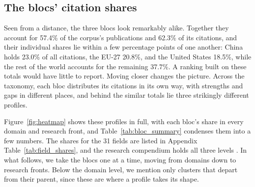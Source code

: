\documentclass[10pt,twocolumn,a4paper]{article}
\begin{document}
	\subsection{The blocs' citation shares}
	\label{sec:shares}
	
	Seen from a distance, the three blocs look remarkably alike. Together they account for 57.4\% of the corpus's publications and 62.3\% of its citations, and their individual shares lie within a few percentage points of one another: China holds 23.0\% of all citations, the EU-27 20.8\%, and the United States 18.5\%, while the rest of the world accounts for the remaining 37.7\%. A ranking built on these totals would have little to report. Moving closer changes the picture. Across the taxonomy, each bloc distributes its citations in its own way, with strengths and gaps in different places, and behind the similar totals lie three strikingly different profiles.
	
	Figure~\ref{fig:heatmap} shows these profiles in full, with each bloc's share in every domain and research front, and Table~\ref{tab:bloc_summary} condenses them into a few numbers. The shares for the 31 fields are listed in Appendix Table~\ref{tab:field_shares}, and the research compendium holds all three levels \parencite{pfundstein2026compendium}. In what follows, we take the blocs one at a time, moving from domains down to research fronts. Below the domain level, we mention only clusters that depart from their parent, since these are where a profile takes its shape.
	
\end{document}

